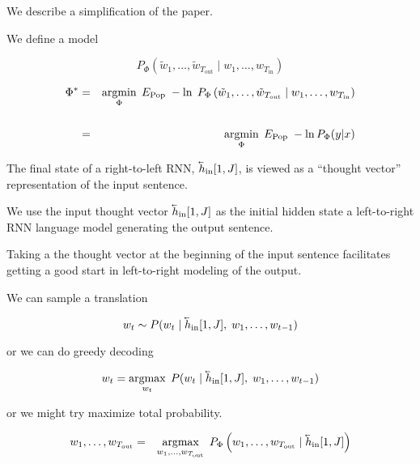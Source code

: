 {\vfill
We describe a simplification of the paper.




\vfill
We define a model

\vfill
$$P_\Phi\left(\tilde{w}_1,\ldots,\tilde{w}_{T_{\mathrm{out}}}\;|\; w_1,\ldots,w_{T_{\mathrm{in}}}\right)$$

\vfill
\begin{eqnarray*}
\Phi^*  & = & \operatorname*{argmin}_\Phi\; E_{\mathrm{Pop}} \;-\ln\;P_\Phi\left(\tilde{w}_1,\ldots,\tilde{w}_{T_{\mathrm{out}}}\;|\; w_1,\ldots,w_{T_{\mathrm{in}}}\right) \\
\\
& = & \operatorname*{argmin}_\Phi \; E_{\mathrm{Pop}} \; -\ln P_\Phi(y|x)
\end{eqnarray*}



\vfill
The final state of a right-to-left RNN, $\cev{h}_{\mathrm{in}}[1,J]$, is viewed as a ``thought vector'' representation of the input sentence.

\vfill
We use the input thought vector $\cev{h}_{\mathrm{in}}[1,J]$ as the initial hidden state a left-to-right RNN language model
generating the output sentence.

\vfill
Taking a the thought vector at the beginning of the input sentence facilitates getting a good start in left-to-right modeling of the output.


We can sample a translation

$$w_t \sim P(w_t\;|\;\cev{h}_{\mathrm{in}}[1,J],\;w_1,\ldots,w_{t-1})$$

\vfill
or we can do greedy decoding

$$w_t = \argmax_{w_t}\; P(w_t\;|\;\cev{h}_{\mathrm{in}}[1,J],\;w_1,\ldots,w_{t-1})$$

\vfill
or we might try maximize total probability.

\begin{eqnarray*}
w_1,\ldots,w_{T_{\mathrm{out}}}
& = & \argmax_{w_1,\ldots,w_{T_{\mathrm{out}}}} \;P_\Phi\left(w_1,\ldots,w_{T_{\mathrm{out}}} \;|\; \cev{h}_{\mathrm{in}}[1,J]\right)
\end{eqnarray*}


}
